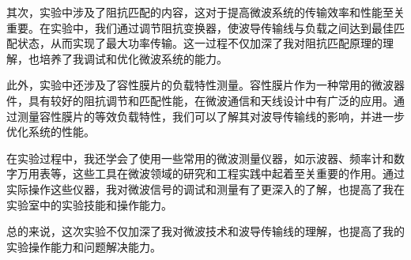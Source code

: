 \documentclass[12pt,hyperref,a4paper,UTF8]{ctexart}
\begin{document}
其次，实验中涉及了阻抗匹配的内容，这对于提高微波系统的传输效率和性能至关重要。在实验中，我们通过调节阻抗变换器，使波导传输线与负载之间达到最佳匹配状态，从而实现了最大功率传输。这一过程不仅加深了我对阻抗匹配原理的理解，也培养了我调试和优化微波系统的能力。

此外，实验中还涉及了容性膜片的负载特性测量。容性膜片作为一种常用的微波器件，具有较好的阻抗调节和匹配性能，在微波通信和天线设计中有广泛的应用。通过测量容性膜片的等效负载特性，我们可以了解其对波导传输线的影响，并进一步优化系统的性能。

在实验过程中，我还学会了使用一些常用的微波测量仪器，如示波器、频率计和数字万用表等，这些工具在微波领域的研究和工程实践中起着至关重要的作用。通过实际操作这些仪器，我对微波信号的调试和测量有了更深入的了解，也提高了我在实验室中的实验技能和操作能力。

总的来说，这次实验不仅加深了我对微波技术和波导传输线的理解，也提高了我的实验操作能力和问题解决能力。

\end{document}
